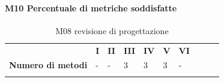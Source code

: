 \paragraph{M10 Percentuale di metriche soddisfatte} \mbox{}
\begin{longtable}[H!] {						
		>{}p{50mm}  		
		>{}p{8mm}
		>{}p{8mm}		
		>{}p{8mm}		
		>{}p{8mm}		
		>{}p{8mm}		
		>{}p{8mm}
		>{}p{8mm}
		>{}p{8mm}
		>{}p{8mm}
	}
	\rowcolor{gray!50}
	\textbf{} & \textbf{I} & \textbf{II} & \textbf{III} & \textbf{IV} & \textbf{V} & \textbf{VI} \TBstrut \\ [2mm]
	\textbf{Numero di metodi} & - & - & 3 & 3 & 3 & - \TBstrut \\ [2mm]
	\rowcolor{white}
	\caption{M08 revisione di progettazione}
\end{longtable}


















